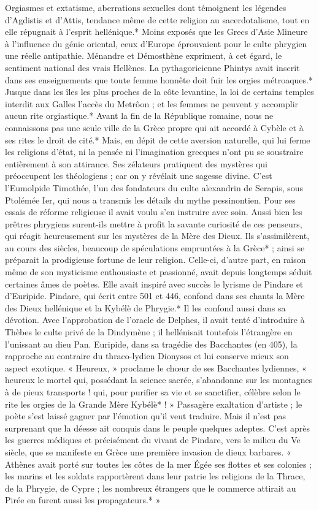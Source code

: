 \documentclass[a4paper, 11pt, oneside, polutonikogreek, french]{article}
\begin{document}
Orgiasmes et extatisme, aberrations sexuelles dont témoignent les légendes d'Agdistis et d'Attis, tendance même de cette religion au sacerdotalisme, tout en elle répugnait à l'esprit hellénique.* Moins exposés que les Grecs d'Asie Mineure à l'influence du génie oriental, ceux d'Europe éprouvaient pour le culte phrygien une réelle antipathie. Ménandre et Démosthène expriment, à cet égard, le sentiment national des vrais Hellènes. La pythagoricienne Phintys avait inscrit dans ses enseignements que toute femme honnête doit fuir les orgies métroaques.* Jusque dans les îles les plus proches de la côte levantine, la loi de certains temples interdit aux Galles l'accès du Metrôon ; et les femmes ne peuvent y accomplir aucun rite orgiastique.* Avant la fin de la République romaine, nous ne connaissons pas une seule ville de la Grèce propre qui ait accordé à Cybèle et à ses rites le droit de cité.* Mais, en dépit de cette aversion naturelle, qui lui ferme les religions d'état, ni la pensée ni l'imagination grecques n'ont pu se soustraire entièrement à son attirance. Ses zélateurs pratiquent des mystères qui préoccupent les théologiens ; car on y révélait une sagesse divine. C'est l'Eumolpide Timothée, l'un des fondateurs du culte alexandrin de Serapis, sous Ptolémée Ier, qui nous a transmis les détails du mythe pessinontien. Pour ses essais de réforme religieuse il avait voulu s'en instruire avec soin. Aussi bien les prêtres phrygiens surent-ils mettre à profit la savante curiosité de ces penseurs, qui réagit heureusement sur les mystères de la Mère des Dieux. Ils s'assimilèrent, au cours des siècles, beaucoup de spéculations empruntées à la Grèce* ; ainsi se préparait la prodigieuse fortune de leur religion. Celle-ci, d'autre part, en raison même de son mysticisme enthousiaste et passionné, avait depuis longtemps séduit certaines âmes de poètes. Elle avait inspiré avec succès le lyrisme de Pindare et d'Euripide. Pindare, qui écrit entre 501 et 446, confond dans ses chants la Mère des Dieux hellénique et la Kybélè de Phrygie.* Il les confond aussi dans sa dévotion. Avec l'approbation de l'oracle de Delphes, il avait tenté d'introduire à Thèbes le culte privé de la Dindymène ; il hellénisait toutefois l'étrangère en l'unissant au dieu Pan. Euripide, dans sa tragédie des Bacchantes (en 405), la rapproche au contraire du thraco-lydien Dionysos et lui conserve mieux son aspect exotique. « Heureux, » proclame le chœur de ses Bacchantes lydiennes, « heureux le mortel qui, possédant la science sacrée, s'abandonne sur les montagnes à de pieux transports ! qui, pour purifier sa vie et se sanctifier, célèbre selon le rite les orgies de la Grande Mère Kybélè* ! » Passagère exaltation d'artiste ; le poète s'est laissé gagner par l'émotion qu'il veut traduire. Mais il n'est pas surprenant que la déesse ait conquis dans le peuple quelques adeptes. C'est après les guerres médiques et précisément du vivant de Pindare, vers le milieu du Ve siècle, que se manifeste en Grèce une première invasion de dieux barbares. « Athènes avait porté sur toutes les côtes de la mer Égée ses flottes et ses colonies ; les marins et les soldats rapportèrent dans leur patrie les religions de la Thrace, de la Phrygie, de Cypre ; les nombreux étrangers que le commerce attirait au Pirée en furent aussi les propagateurs.* » 
\end{document}
